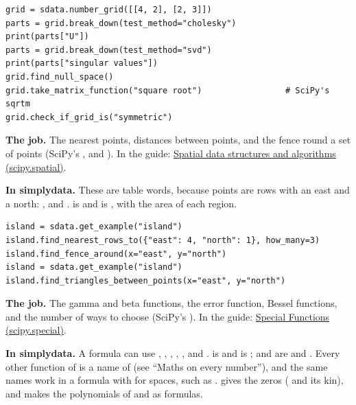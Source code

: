 \begin{lstlisting}[style=py]
grid = sdata.number_grid([[4, 2], [2, 3]])
parts = grid.break_down(test_method="cholesky")
print(parts["U"])
parts = grid.break_down(test_method="svd")
print(parts["singular values"])
grid.find_null_space()
grid.take_matrix_function("square root")                 # SciPy's sqrtm
grid.check_if_grid_is("symmetric")
\end{lstlisting}


\textbf{The job.} The nearest points, distances between points, and the fence round a set of points
(SciPy's ,  and ). In the guide:
\href{https://docs.scipy.org/doc/scipy/tutorial/spatial.html}{Spatial data structures and algorithms
(scipy.spatial)}.

\textbf{In simplydata.} These are table words, because points are rows with an east and a north:
,  and
.  is  and
 is , with the area of each region.

\begin{lstlisting}[style=py]
island = sdata.get_example("island")
island.find_nearest_rows_to({"east": 4, "north": 1}, how_many=3)
island.find_fence_around(x="east", y="north")
island = sdata.get_example("island")
island.find_triangles_between_points(x="east", y="north")
\end{lstlisting}


\textbf{The job.} The gamma and beta functions, the error function, Bessel functions, and the number of
ways to choose (SciPy's ). In the guide:
\href{https://docs.scipy.org/doc/scipy/tutorial/special.html}{Special Functions (scipy.special)}.

\textbf{In simplydata.} A formula can use , , , ,
,  and .  is  and
 is ;  and 
are  and . Every other function of  is a name of
 (see ``Maths on every number''), and the same names work in a formula with
\code{\_} for spaces, such as .  gives the zeros
( and its kin), and  makes the polynomials of
 and  as formulas.

